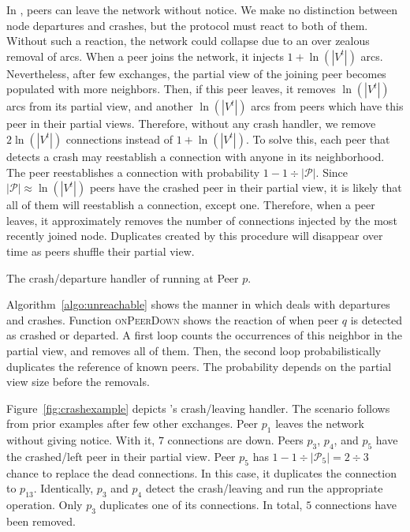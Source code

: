 In \SPRAY, peers can leave the network without notice. We make no distinction
between node departures and crashes, but the protocol must react to both of
them. Without such a reaction, the network could collapse due to an over zealous
removal of arcs. When a peer joins the network, it injects $1+\ln(|V^t|)$
arcs. Nevertheless, after few exchanges, the partial view of the joining peer
becomes populated with more neighbors. Then, if this peer leaves, it removes
$\ln(|V^t|)$ arcs from its partial view, and another $\ln(|V^t|)$ arcs from
peers which have this peer in their partial views. Therefore, without any crash
handler, we remove $2\ln(|V^t|)$ connections instead of $1+\ln(|V^t|)$. To solve
this, each peer that detects a crash may reestablish a connection with anyone in
its neighborhood. %
The peer reestablishes a connection with probability
$1-{1\div{|\mathcal{P}|}}$. Since ${|\mathcal{P}|}\approx \ln(|V^t|)$ peers have
the crashed peer in their partial view, it is likely that all of them will
reestablish a connection, except one. Therefore, when a peer leaves, it
approximately removes the number of connections injected by the most recently
joined node. Duplicates created by this procedure will disappear over time as
peers shuffle their partial view.

\begin{algorithm}[h]
  
  \caption{\label{algo:unreachable}The crash/departure handler of \SPRAY running
    at Peer $p$.}
\end{algorithm}

Algorithm~\ref{algo:unreachable} shows the manner in which \SPRAY deals with
departures and crashes.  Function \textsc{onPeerDown} shows the reaction of \SPRAY
when peer $q$ is detected as crashed or departed. A first loop counts the
occurrences of this neighbor in the partial view, and removes all of
them. Then, the second loop probabilistically duplicates the reference of 
known peers. The probability depends on the partial view size before the
removals.

Figure~\ref{fig:crashexample} depicts \SPRAY's crash/leaving handler. The
scenario follows from prior examples after few other exchanges. Peer $p_1$
leaves the network without giving notice. With it, $7$ connections are
down. Peers $p_3$, $p_4$, and $p_5$ have the crashed/left peer in their partial
view. Peer $p_5$ has $1-{1\div{|\mathcal{P}_5|}}={2\div{3}}$ chance to replace
the dead connections. In this case, it duplicates the connection to
$p_{13}$. Identically, $p_3$ and $p_4$ detect the crash/leaving and run the
appropriate operation. Only $p_3$ duplicates one of its connections. In total,
$5$ connections have been removed.


